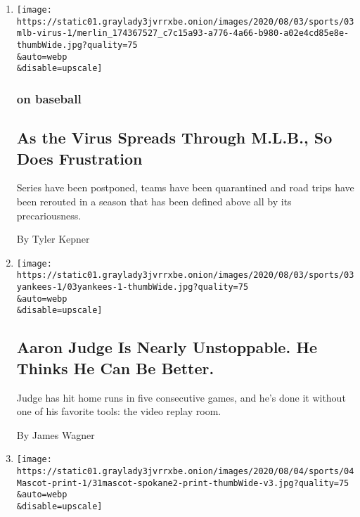 \begin{enumerate}
\def\labelenumi{\arabic{enumi}.}
\item
  \href{/2020/08/03/sports/baseball/mlb-coronavirus-outbreak.html}{}

  \texttt{[image: https://static01.graylady3jvrrxbe.onion/images/2020/08/03/sports/03mlb-virus-1/merlin\_174367527\_c7c15a93-a776-4a66-b980-a02e4cd85e8e-thumbWide.jpg?quality=75\\\&auto=webp\\\&disable=upscale]}

  \hypertarget{on-baseball}{%
  \subsubsection{on baseball}\label{on-baseball}}

  \hypertarget{as-the-virus-spreads-through-mlb-so-does-frustration}{%
  \subsection{As the Virus Spreads Through M.L.B., So Does
  Frustration}\label{as-the-virus-spreads-through-mlb-so-does-frustration}}

  Series have been postponed, teams have been quarantined and road trips
  have been rerouted in a season that has been defined above all by its
  precariousness.

  By Tyler Kepner
\item
  \href{/2020/08/03/sports/baseball/aaron-judge-yankees.html}{}

  \texttt{[image: https://static01.graylady3jvrrxbe.onion/images/2020/08/03/sports/03yankees-1/03yankees-1-thumbWide.jpg?quality=75\\\&auto=webp\\\&disable=upscale]}

  \hypertarget{aaron-judge-is-nearly-unstoppable-he-thinks-he-can-be-better}{%
  \subsection{Aaron Judge Is Nearly Unstoppable. He Thinks He Can Be
  Better.}\label{aaron-judge-is-nearly-unstoppable-he-thinks-he-can-be-better}}

  Judge has hit home runs in five consecutive games, and he's done it
  without one of his favorite tools: the video replay room.

  By James Wagner
\item
  \href{/2020/08/03/sports/baseball/indians-team-names-mascots.html}{}

  \texttt{[image: https://static01.graylady3jvrrxbe.onion/images/2020/08/04/sports/04Mascot-print-1/31mascot-spokane2-print-thumbWide-v3.jpg?quality=75\\\&auto=webp\\\&disable=upscale]}


\end{enumerate}
